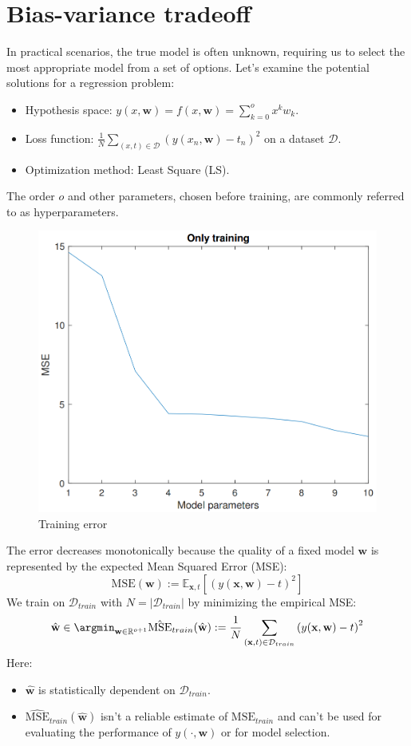 \section{Bias-variance tradeoff}

In practical scenarios, the true model is often unknown, requiring us to select the most appropriate model from a set of options. 
Let's examine the potential solutions for a regression problem:
\begin{itemize}
    \item Hypothesis space: $y(x,\textbf{w})=f(x,\textbf{w})=\sum_{k=0}^{o}x^kw_k$. 
    \item Loss function: $\frac{1}{N}\sum_{(x,t)\in\mathcal{D}}\left(y(x_n,\textbf{w})-t_n\right)^2$ on a dataset $\mathcal{D}$. 
    \item Optimization method: Least Square (LS). 
\end{itemize}
The order $o$ and other parameters, chosen before training, are commonly referred to as hyperparameters.
\begin{figure}[H]
    \centering
    \includegraphics[width=0.5\linewidth]{images/err.png}
    \caption{Training error}
\end{figure}
The error decreases monotonically because the quality of a fixed model $\textbf{w}$ is represented by the expected Mean Squared Error (MSE):
\[\text{MSE}(\textbf{w}):=\mathbb{E}_{\textbf{x},t}\left[\left(y(\textbf{x},\textbf{w})-t\right)^2\right]\]
We train on $\mathcal{D}_{train}$ with $N = \left\lvert \mathcal{D}_{train} \right\rvert $ by minimizing the empirical MSE:
\[\hat{\textbf{w}}\in \argmin_{\textbf{w}\in\mathbb{R}^{o+1}}\hat{\text{MSE}}_{train}(\hat{\textbf{w}}):=\dfrac{1}{N}\sum_{(\textbf{x},t)\in\mathcal{D}_{train}}\left(y(\textbf{x},\textbf{w})-t\right)^2\]
Here: 
\begin{itemize}
    \item $\hat{\textbf{w}}$ is statistically dependent on $\mathcal{D}_{train}$. 
    \item $\hat{\text{MSE}}_{train}(\hat{\textbf{w}})$ isn't a reliable estimate of $\text{MSE}_{train}$ and can't be used for evaluating the performance of $y(\cdot,\textbf{w})$ or for model selection.
\end{itemize}
